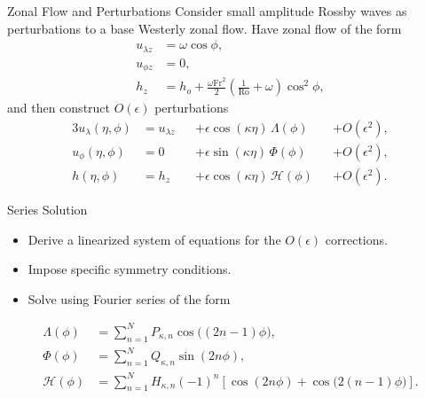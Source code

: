 \documentclass[pdf,distiller]{prosper}
\begin{document}

\begin{slide}{Zonal Flow and Perturbations}
Consider small amplitude Rossby waves as perturbations to a base Westerly zonal flow. Have zonal flow of the form
\begin{align*}
u_{\lambda z} &= \omega \cos\phi,\\
u_{\phi z} &= 0,\\
h_z &= h_o + \frac{\omega \mathrm{Fr}^2}{2}\left(\frac{1}{\mathrm{Ro}}+\omega \right)\cos^2\!\phi,
\end{align*}
and then construct $O(\epsilon)$ perturbations
\begin{alignat*}{3}
u_{\lambda}(\eta,\phi) &= u_{\lambda z} &\!&+ \epsilon \cos(\kappa\eta)\,\Lambda(\phi) &\!&+ O(\epsilon^2),\\
u_{\phi}(\eta,\phi) &= 0 &\!&+ \epsilon \sin(\kappa\eta)\,\Phi(\phi) &\!&+ O(\epsilon^2),\\
h(\eta,\phi) &= h_z &\!&+ \epsilon \cos(\kappa\eta)\,\mathcal{H}(\phi) &\!&+ O(\epsilon^2).
\end{alignat*}
\end{slide}

\begin{slide}{Series Solution}
\begin{itemize}
\item Derive a linearized system of equations for the $O(\epsilon)$ corrections. 
\item Impose specific symmetry conditions.
\item Solve using Fourier series of the form
\end{itemize}
\begin{align*}
\Lambda(\phi) &= \sum_{n=1}^N P_{\kappa,n}\cos\bigl((2n-1)\phi\bigr),\\
\Phi(\phi) &= \sum_{n=1}^N Q_{\kappa,n}\sin(2n\phi),\\
\mathcal{H}(\phi) &= \sum_{n=1}^N H_{\kappa,n} (-1)^n \left[ \cos(2n\phi)+\cos\bigl(2(n-1)\phi\bigr) \right].
\end{align*}
\end{slide}
\end{document}
